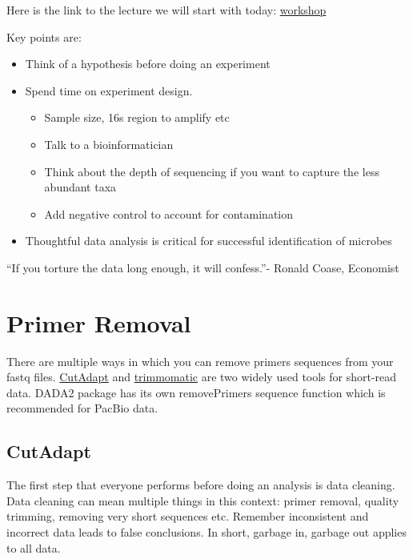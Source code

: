 \documentclass[
]{book}
\providecommand{\tightlist}{%
  \setlength{\itemsep}{0pt}\setlength{\parskip}{0pt}}
\begin{document}
Here is the link to the lecture we will start with today: \href{new_microbiomeworkshop.pdf}{workshop}

Key points are:

\begin{itemize}
\tightlist
\item
  Think of a hypothesis before doing an experiment
\item
  Spend time on experiment design.

  \begin{itemize}
  \tightlist
  \item
    Sample size, 16s region to amplify etc
  \item
    Talk to a bioinformatician
  \item
    Think about the depth of sequencing if you want to capture the less abundant taxa
  \item
    Add negative control to account for contamination
  \end{itemize}
\item
  Thoughtful data analysis is critical for successful identification of microbes
\end{itemize}

``If you torture the data long enough, it will confess.''- Ronald Coase, Economist

\hypertarget{primer-removal}{%
\chapter{Primer Removal}\label{primer-removal}}

There are multiple ways in which you can remove primers sequences from your fastq files.
\href{https://cutadapt.readthedocs.io/en/stable/index.html}{CutAdapt} and \href{http://www.usadellab.org/cms/?page=trimmomatic}{trimmomatic} are two widely used tools for short-read data. DADA2 package has its own removePrimers sequence function which is recommended for PacBio data.

\hypertarget{cutadapt}{%
\section{CutAdapt}\label{cutadapt}}

The first step that everyone performs before doing an analysis is data cleaning. Data cleaning can mean multiple things in this context: primer removal, quality trimming, removing very short sequences etc. Remember inconsistent and incorrect data leads to false conclusions. In short, garbage in, garbage out applies to all data.
\end{document}

